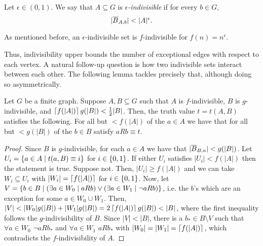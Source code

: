         \begin{definition} \label{def:epsilon_indivisible}
            Let $\epsilon \in (0,1)$.
            We say that $A \subseteq G$ is \emph{$\epsilon$-indivisible} if for every $b \in G$,
            \[
                | \overline{B}_{A,b} | < |A|^{\epsilon}.
            \]
        \end{definition}

        As mentioned before, an $\epsilon$-indivisible set is $f$-indivisible for $f(n) = n^\epsilon$.

        Thus, indivisibility upper bounds the number of exceptional edges with respect to each vertex.
        A natural follow-up question is how two indivisible sets interact between each other.
        The following lemma tackles precisely that, although doing so asymmetrically.

        \begin{lemma} \label{lem:average_condition_statement}
            Let $G$ be a finite graph.
            Suppose $A, B \subseteq G$ such that $A$ is $f$-indivisible, $B$ is $g$-indivisible, and $\left\lceil f(|A|) \right\rceil g(|B|) < \frac{1}{2} |B|$.
            Then, the truth value $t = t(A,B)$ satisfies the following.
            For all but $< f(|A|)$ of the $a \in A$ we have that for all but $< g(|B|)$ of the $b \in B$ satisfy $a R b \equiv t$.
            \begin{proof}
                Since $B$ is $g$-indivisible, for each $a \in A$ we have that $| \overline{B}_{B,a} | < g(|B|)$.
                Let $U_i = \{ a \in A \mid t(a,B) \equiv i \}$ for $i \in \{ 0,1 \}$.
                If either $U_i$ satisfies $|U_i| < f(|A|)$ then the statement is true.
                Suppose not.
                Then, $|U_i| \geq f(|A|)$ and we can take $W_i \subseteq U_i$ with $|W_i| = \left\lceil f(|A|) \right\rceil$ for $i \in \{ 0,1 \}$.
                Now, let $V = \{ b \in B \mid (\exists a \in W_0 \mid a R b) \vee (\exists a \in W_1 \mid \lnot a R b) \}$,
                i.e. the $b$'s which are an exception for some $a \in W_0 \cup W_1$.
                Then, $|V| < |W_0| g(|B|) + |W_1| g(|B|) = 2 \left\lceil f(|A|) \right\rceil g(|B|) < |B|$, where the first inequality follows the
                $g$-indivisibility of $B$.
                Since $|V| < |B|$, there is a $b_* \in B \setminus V$ such that $\forall a \in W_0$ $\lnot a R b_*$ and
                $\forall a \in W_1$ $a R b_*$ with $|W_0| = |W_1| = \left\lceil f(|A|) \right\rceil$, which contradicts the $f$-indivisibility of $A$.
            \end{proof}
        \end{lemma}

